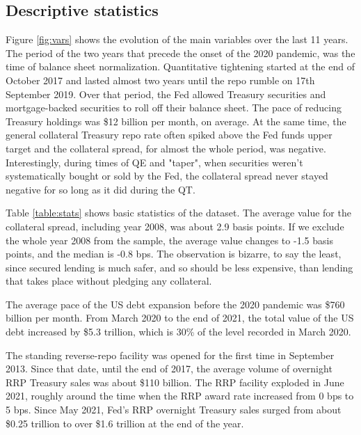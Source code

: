 \documentclass[11pt,a4paper,english,oneside]{article}
\begin{document}
\subsection{Descriptive statistics} \label{sec:stats}

Figure \ref{fig:vars} shows the evolution of the main variables over the last 11 years. The period of the two years that precede the onset of the 2020 pandemic, was the time of balance sheet normalization. Quantitative tightening started at the end of October 2017 and lasted almost two years until the repo rumble on 17th September 2019. Over that period, the Fed allowed Treasury securities and mortgage-backed securities to roll off their balance sheet. The pace of reducing Treasury holdings was \$12 billion per month, on average. At the same time, the general collateral Treasury repo rate often spiked above the Fed funds upper target and the collateral spread, for almost the whole period, was negative. Interestingly, during times of QE and "taper", when securities weren't systematically bought or sold by the Fed, the collateral spread never stayed negative for so long as it did during the QT.

Table \ref{table:stats} shows basic statistics of the dataset. The average value for the collateral spread, including year 2008, was about 2.9 basis points. If we exclude the whole year 2008 from the sample, the average value changes to -1.5 basis points, and the median is -0.8 bps. The observation is bizarre, to say the least, since secured lending is much safer, and so should be less expensive, than lending that takes place without pledging any collateral.

The average pace of the US debt expansion before the 2020 pandemic was \$760 billion per month. From March 2020 to the end of 2021, the total value of the US debt increased by \$5.3 trillion, which is 30\% of the level recorded in March 2020.

The standing reverse-repo facility was opened for the first time in September 2013. Since that date, until the end of 2017, the average volume of overnight RRP Treasury sales was about \$110 billion. The RRP facility exploded in June 2021, roughly around the time when the RRP award rate increased from 0 bps to 5 bps. Since May 2021, Fed's RRP overnight Treasury sales surged from about \$0.25 trillion to over \$1.6 trillion at the end of the year.
\end{document}
